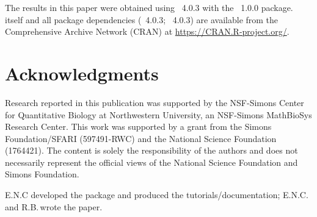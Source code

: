 \documentclass[codesnippet]{jss}
\newcommand{\RBnote}[1]{\textcolor{red}{#1}}
\begin{document}

The results in this paper were obtained using
~4.0.3 with the
~1.0.0 package.  itself
and all package dependencies (~4.0.3; ~4.0.3) are available from the Comprehensive
 Archive Network (CRAN) at
\url{https://CRAN.R-project.org/}.


\section*{Acknowledgments}

Research reported in this publication was supported by the NSF-Simons Center for Quantitative Biology at Northwestern University, an NSF-Simons MathBioSys Research Center. This work was supported by a grant from the Simons Foundation/SFARI (597491-RWC) and the National Science Foundation (1764421). The content is solely the responsibility of the authors and does not necessarily represent the official views of the National Science Foundation and Simons Foundation.

E.N.C developed the  package and produced the tutorials/documentation; E.N.C.\,and R.B.\,wrote the paper.




\newpage
\end{document}
